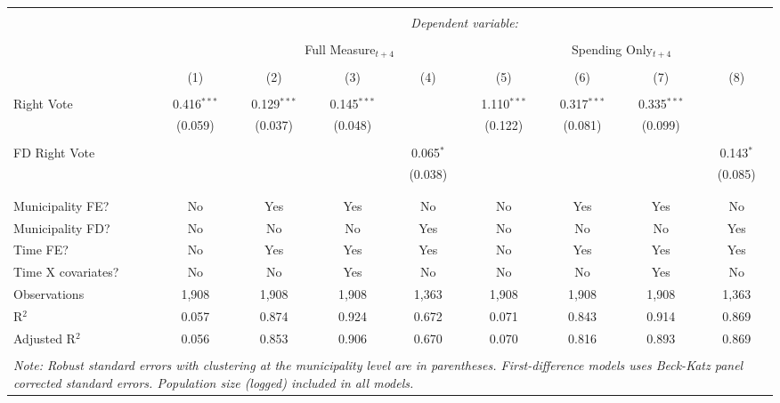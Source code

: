\documentclass[a4paper,12pt]{article}
\begin{document}
\begin{table}[!htbp] \centering 
	\caption{} 
	\footnotesize
	\label{main_res} 
	\begin{tabular}{@{\extracolsep{5pt}}lcccccccc} 
		\\[-1.8ex]\hline 
		\hline \\[-1.8ex] 
		& \multicolumn{8}{c}{\textit{Dependent variable:}} \\ 
		\cline{2-9} 
		\\[-1.8ex] & &\multicolumn{3}{c}{Full Measure$_{t+4}$} & &  \multicolumn{2}{c}{Spending Only$_{t+4}$} &  \\ 
		\\[-1.8ex] & (1) & (2) & (3) & (4) & (5) & (6) & (7) & (8)\\ 
		\hline \\[-1.8ex] 
		Right Vote & 0.416$^{***}$ & 0.129$^{***}$ & 0.145$^{***}$ &  & 1.110$^{***}$ & 0.317$^{***}$ & 0.335$^{***}$ &  \\ 
		& (0.059) & (0.037) & (0.048) &  & (0.122) & (0.081) & (0.099) &  \\ 
		& & & & & & & & \\ 
		FD Right Vote &  &  &  & 0.065$^{*}$ &  &  &  & 0.143$^{*}$ \\ 
		&  &  &  & (0.038) &  &  &  & (0.085) \\ 
		& & & & & & & & \\ 
		\hline \\[-1.8ex] 
		Municipality FE? & No & Yes & Yes & No & No & Yes & Yes & No \\ 
		Municipality FD? & No & No & No & Yes & No & No & No & Yes \\ 
		Time FE? & No & Yes & Yes & Yes & No & Yes & Yes & Yes \\ 
		Time X covariates? & No & No & Yes & No & No & No & Yes & No \\
		Observations & 1,908 & 1,908 & 1,908 & 1,363 & 1,908 & 1,908 & 1,908 & 1,363 \\ 
		R$^{2}$ & 0.057 & 0.874 & 0.924 & 0.672 & 0.071 & 0.843 & 0.914 & 0.869 \\ 
		Adjusted R$^{2}$ & 0.056 & 0.853 & 0.906 & 0.670 & 0.070 & 0.816 & 0.893 & 0.869 \\ 
		\hline 
		\hline \\[-1.8ex] 
		\multicolumn{9}{p{17 cm}}{\emph{Note: Robust standard errors with clustering at the municipality level are in parentheses. First-difference models uses Beck-Katz panel corrected standard errors. Population size (logged) included in all models.}} 
	\end{tabular} 
\end{table} 
\end{document}
